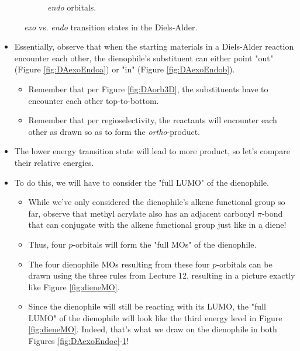 \documentclass[../notes.tex]{subfiles}
\begin{document}
\begin{itemize}
\begin{figure}[h!]
\begin{subfigure}[b]{0.35\linewidth}
            \caption{\emph{endo} orbitals.}
            \label{fig:DAexoEndod}
        \end{subfigure}
        \caption{\emph{exo} vs. \emph{endo} transition states in the Diels-Alder.}
        \label{fig:DAexoEndo}
    \end{figure}
    \begin{itemize}
        \item Essentially, observe that when the starting materials in a Diels-Alder reaction encounter each other, the dienophile's substituent can either point "out" (Figure \ref{fig:DAexoEndoa}) or "in" (Figure \ref{fig:DAexoEndob}).
        \begin{itemize}
            \item Remember that per Figure \ref{fig:DAorb3D}, the substituents have to encounter each other top-to-bottom.
            \item Remember that per regioselectivity, the reactants will encounter each other as drawn so as to form the \emph{ortho}-product.
        \end{itemize}
        \item The lower energy transition state will lead to more product, so let's compare their relative energies.
        \item To do this, we will have to consider the "full LUMO" of the dienophile.
        \begin{itemize}
            \item While we've only considered the dienophile's alkene functional group so far, observe that methyl acrylate also has an adjacent carbonyl $\pi$-bond that can conjugate with the alkene functional group just like in a diene!
            \item Thus, four $p$-orbitals will form the "full MOs" of the dienophile.
            \item The four dienophile MOs resulting from these four $p$-orbitals can be drawn using the three rules from Lecture 12, resulting in a picture exactly like Figure \ref{fig:dieneMO}.
            \item Since the dienophile will still be reacting with its LUMO, the "full LUMO" of the dienophile will look like the third energy level in Figure \ref{fig:dieneMO}. Indeed, that's what we draw on the dienophile in both Figures \ref{fig:DAexoEndoc}-\ref{fig:DAexoEndod}!

\end{itemize}
\end{itemize}
\end{itemize}
\end{document}
